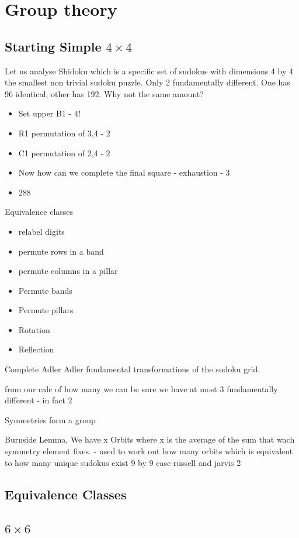 \documentclass[a4paper,11pt]{report}
\newcounter{row}
\newcounter{col}
\begin{document}
\chapter{Group theory}
\section{Starting Simple $4 \times 4$}
Let us analyse Shidoku which is a specific set of sudokus with dimensions 4 by 4 the smallest non trivial sudoku puzzle. Only 2 fundamentally different. One has 96 identical, other has 192. Why not the same amount?

\begin{itemize}
\item Set upper B1 - $4!$
\item R1 permutation of 3,4 - $2$
\item C1 permutation of 2,4 - $2$
\item Now how can we complete the final square - exhaustion - $3$
\item 288
\end{itemize}

Equivalence classes
\begin{itemize}
\item relabel digits
\item permute rows in a band
\item permute columns in a pillar
\item Permute bands
\item Permute pillars
\item Rotation
\item Reflection
\end{itemize}
Complete Adler Adler fundamental transformations of the sudoku grid.

from our calc of how many we can be sure we have at most 3 fundamentally different - in fact 2

Symmetries form a group 

Burnside Lemma,  We have x Orbits where x is the average of the sum that wach symmetry element fixes. - used to work out how many orbits which is equivalent to how many unique sudokus exist
9 by 9 case russell and jarvis 2




	\section{Equivalence Classes}
	\section{$6 \times 6$}
\end{document}
